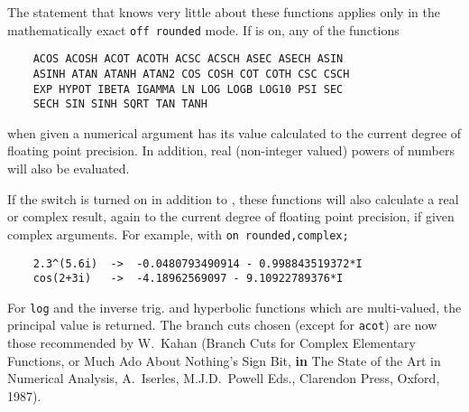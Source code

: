 \hypertarget{operator:LN}{}
The statement that {\REDUCE} knows very little about these functions
applies only in the mathematically exact \texttt{off rounded} mode.  If
 is on, any of the functions
\begin{verbatim}
    ACOS ACOSH ACOT ACOTH ACSC ACSCH ASEC ASECH ASIN
    ASINH ATAN ATANH ATAN2 COS COSH COT COTH CSC CSCH
    EXP HYPOT IBETA IGAMMA LN LOG LOGB LOG10 PSI SEC
    SECH SIN SINH SQRT TAN TANH
\end{verbatim}
when given a numerical argument has its value calculated to the current
degree of floating point precision.  In addition, real (non-integer
valued) powers of numbers will also be evaluated.

If the  switch is turned on in addition to ,
these functions will also calculate a real or complex result, again to
the current degree of floating point precision,
if given complex arguments.  For example, with \texttt{on rounded,complex;}
\begin{verbatim}
    2.3^(5.6i)  ->  -0.0480793490914 - 0.998843519372*I
    cos(2+3i)   ->  -4.18962569097 - 9.10922789376*I
\end{verbatim}

For \texttt{log} and the inverse trig. and hyperbolic functions which are
multi-valued, the principal value is returned. The branch cuts chosen
(except for \texttt{acot}) are now
those recommended by W.~Kahan (Branch Cuts for Complex Elementary Functions,
or Much Ado About Nothing's Sign Bit,
\textbf{in} The State of the Art in Numerical Analysis,
A.~Iserles, M.J.D.~Powell Eds., Clarendon Press, Oxford, 1987).

